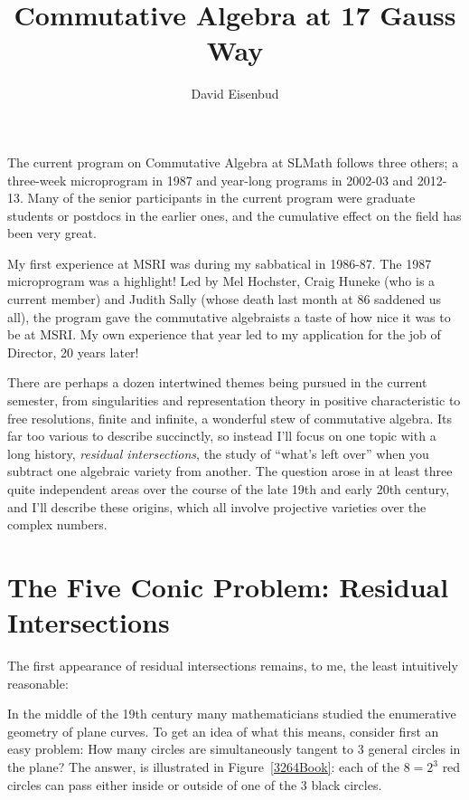 \documentclass[11pt, oneside]{article}   	%
\title{Commutative Algebra at 17 Gauss Way}
\author{David Eisenbud}
\begin{document}
\maketitle


The current program on Commutative Algebra at SLMath follows three others; a three-week microprogram in 1987 and year-long programs in 2002-03 and 2012-13. Many of the senior participants in the current program were graduate students or postdocs in the earlier ones, and the cumulative effect on the field has been very great.

My first experience at MSRI was during my sabbatical in 1986-87. The 1987 microprogram was a highlight! Led by Mel Hochster, Craig Huneke (who is a current member) and Judith Sally (whose death last month at 86 saddened us all), the program gave the commutative algebraists a taste of how nice it was to be at MSRI. My own experience that year led to my application for the job of Director, 20 years later!

There are perhaps a dozen intertwined themes being pursued in the current semester, from singularities and representation theory in positive characteristic to free resolutions, finite and infinite, a wonderful stew of commutative algebra. Its far too various to describe succinctly, so instead I'll focus on one topic with a long history, \emph{residual intersections}, the study of ``what's left over'' when you subtract one algebraic variety from another. The question arose in at least three quite independent areas over the course of the late 19th and early 20th century, and I'll describe these origins, which all involve  projective varieties over the complex numbers.

\section{The Five Conic Problem: Residual Intersections}

The first appearance of residual intersections remains, to me, the least intuitively reasonable:

In the middle of the 19th century many mathematicians studied the enumerative geometry of plane curves. To get an idea of what this means, consider first an easy problem: How many circles are simultaneously tangent to 3 general circles in the plane? The answer, is illustrated in Figure~\ref{3264Book}: each of the $8 = 2^{3}$ red circles can pass either inside or outside 
of one of the 3 black circles. 
\end{document}
